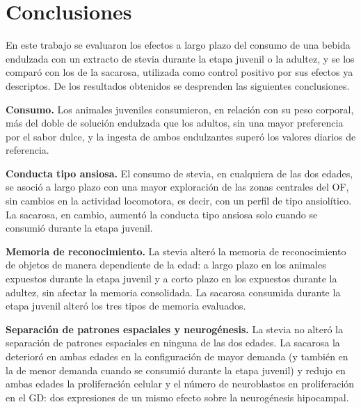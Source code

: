 \chapter{Conclusiones}\label{cap:conclusiones}

En este trabajo se evaluaron los efectos a largo plazo del consumo de una bebida endulzada con un extracto de stevia durante la etapa juvenil o la adultez, y se los comparó con los de la sacarosa, utilizada como control positivo por sus efectos ya descriptos. De los resultados obtenidos se desprenden las siguientes conclusiones.

\textbf{Consumo.} Los animales juveniles consumieron, en relación con su peso corporal, más del doble de solución endulzada que los adultos, sin una mayor preferencia por el sabor dulce, y la ingesta de ambos endulzantes superó los valores diarios de referencia.

\textbf{Conducta tipo ansiosa.} El consumo de stevia, en cualquiera de las dos edades, se asoció a largo plazo con una mayor exploración de las zonas centrales del OF, sin cambios en la actividad locomotora, es decir, con un perfil de tipo ansiolítico. La sacarosa, en cambio, aumentó la conducta tipo ansiosa solo cuando se consumió durante la etapa juvenil.

\textbf{Memoria de reconocimiento.} La stevia alteró la memoria de reconocimiento de objetos de manera dependiente de la edad: a largo plazo en los animales expuestos durante la etapa juvenil y a corto plazo en los expuestos durante la adultez, sin afectar la memoria consolidada. La sacarosa consumida durante la etapa juvenil alteró los tres tipos de memoria evaluados.

\textbf{Separación de patrones espaciales y neurogénesis.} La stevia no alteró la separación de patrones espaciales en ninguna de las dos edades. La sacarosa la deterioró en ambas edades en la configuración de mayor demanda (y también en la de menor demanda cuando se consumió durante la etapa juvenil) y redujo en ambas edades la proliferación celular y el número de neuroblastos en proliferación en el GD: dos expresiones de un mismo efecto sobre la neurogénesis hipocampal.

